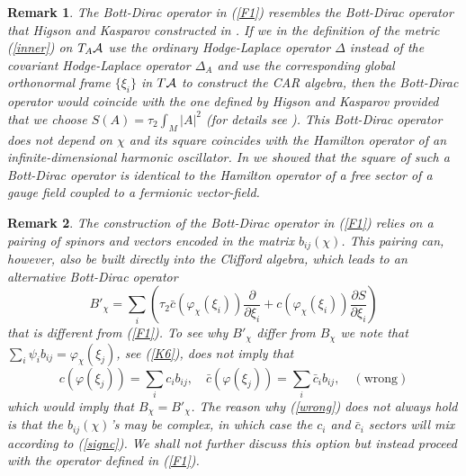 \documentclass[letterpaper,11pt]{article}
\def\ca{{\cal A}}
\newcommand{\pa}{\partial}
\newtheorem{remark}{Remark}
\begin{document}
\begin{remark}
The Bott-Dirac operator in (\ref{F1}) resembles the Bott-Dirac operator that Higson and Kasparov constructed in \cite{Higson}. If we in the definition of the metric (\ref{inner}) on $T_A\ca$ use the ordinary Hodge-Laplace operator $\Delta$ instead of the covariant Hodge-Laplace operator $\Delta_A$ and use the corresponding global orthonormal frame $\{\xi_i\}$ in $T\ca$ to construct the CAR algebra, then the Bott-Dirac operator would coincide with the one defined by Higson and Kasparov provided that we choose $S(A) =\tau_2 \int_M \vert A\vert ^2$ (for details see \cite{Aastrup:2017atr}). This Bott-Dirac operator does not depend on $\chi$ and its square coincides with the Hamilton operator of an infinite-dimensional harmonic oscillator. In \cite{Aastrup:2017atr} we showed that the square of such a Bott-Dirac operator is identical to the Hamilton operator of a free sector of a gauge field coupled to a fermionic vector-field.
\end{remark}














\begin{remark}


The construction of the Bott-Dirac operator in (\ref{F1}) relies on a pairing of spinors and vectors encoded in the matrix $b_{ij}(\chi)$. This pairing can, however, also be built directly into the Clifford algebra, which leads to an alternative Bott-Dirac operator 
$$
B'_\chi = \sum_i \left( \tau_2 \bar{c} (\varphi_\chi(\xi_i))\frac{\pa}{\pa \xi_i}   + {c}(\varphi_\chi(\xi_i)) \frac{\pa S}{\pa \xi_i} \right)
$$
 that is different from (\ref{F1}).
To see why $B'_\chi$ differ from $B_\chi$ we note that
$
\sum_i \psi_i b_{ij} = \varphi_\chi(\xi_j)
$, see (\ref{K6}),
does not imply that
\begin{equation}
c(\varphi(\xi_j)) = \sum_i c_i b_{ij}, \quad \bar{c}(\varphi(\xi_j)) = \sum_i \bar{c}_i b_{ij}, \quad (\mbox{wrong})
\label{wrong}
\end{equation}
which would imply that $B_\chi=B'_\chi$. The reason why (\ref{wrong}) does not always hold is that the $b_{ij}(\chi)$'s may be complex, in which case the $c_i$ and $\bar{c}_i$ sectors will mix according to (\ref{signc}). We shall not further discuss this option but instead proceed with the operator defined in (\ref{F1}).

\end{remark}
\end{document}
